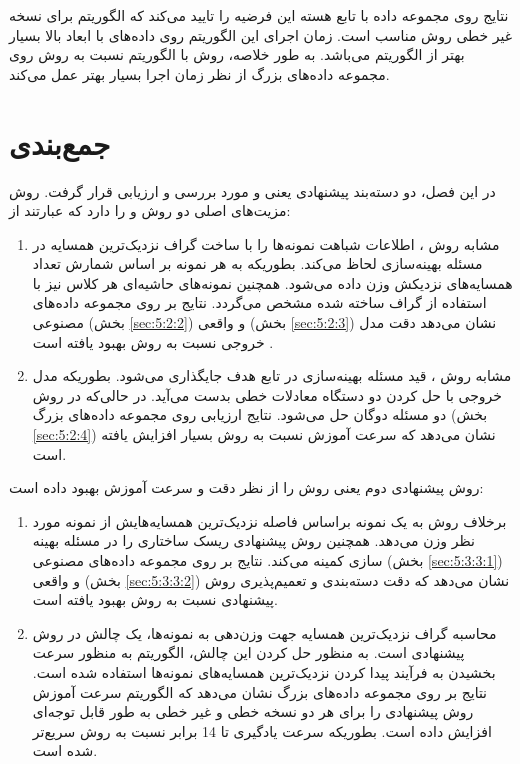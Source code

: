 نتایج روی مجموعه داده  با تابع هسته  این فرضیه را تایید می‌کند که الگوریتم  برای نسخه غیر خطی روش   مناسب است. زمان اجرای این الگوریتم روی داده‌های با ابعاد بالا بسیار بهتر از الگوریتم  می‌باشد. به طور خلاصه، روش  با الگوریتم  نسبت به روش  روی مجموعه داده‌های بزرگ از نظر زمان اجرا بسیار بهتر عمل می‌کند.

\section{جمع‌بندی}\label{sec:5:4}
در این فصل، دو دسته‌بند پیشنهادی یعنی  و  مورد بررسی و ارزیابی قرار گرفت. روش  مزیت‌های اصلی دو روش  و  را دارد که عبارتند از:
\begin{enumerate}
	\item مشابه روش ، اطلاعات شباهت نمونه‌ها را با ساخت گراف نزدیک‌ترین همسایه در مسئله بهینه‌سازی لحاظ می‌کند. بطوریکه به هر نمونه بر اساس شمارش تعداد همسایه‌های نزدیکش وزن داده می‌شود. همچنین نمونه‌های حاشیه‌ای هر کلاس نیز با استفاده از گراف ساخته شده مشخص می‌گردد.  نتایج بر روی مجموعه داده‌های مصنوعی (بخش \ref{sec:5:2:2}) و واقعی (بخش \ref{sec:5:2:3}) نشان می‌دهد دقت مدل خروجی نسبت به روش  بهبود یافته است .
	\item مشابه روش ، قید مسئله بهینه‌سازی در تابع هدف جایگذاری می‌شود. بطوریکه مدل خروجی با حل کردن دو دستگاه معادلات خطی بدست می‌آید. در حالی‌که در روش   دو مسئله دوگان حل می‌شود. نتایج ارزیابی روی مجموعه داده‌های بزرگ  (بخش \ref{sec:5:2:4}) نشان می‌دهد که سرعت آموزش نسبت به روش  بسیار افزایش یافته است.    
\end{enumerate}

روش پیشنهادی دوم یعنی  روش  را از نظر دقت و سرعت آموزش بهبود داده است:
\begin{enumerate}
	\item {} برخلاف روش   به یک نمونه براساس فاصله نزدیک‌ترین همسایه‌هایش از نمونه مورد نظر وزن می‌دهد. همچنین روش پیشنهادی ریسک ساختاری را در مسئله بهینه سازی کمینه می‌کند. نتایج بر روی مجموعه داده‌های مصنوعی  (بخش \ref{sec:5:3:3:1}) و واقعی (بخش  \ref{sec:5:3:3:2}) نشان می‌دهد که دقت دسته‌بندی و تعمیم‌پذیری روش پیشنهادی نسبت به روش  بهبود یافته است.
	\item محاسبه گراف نزدیک‌ترین همسایه جهت وزن‌دهی به نمونه‌ها، یک چالش در روش پیشنهادی است. به منظور حل کردن این چالش، الگوریتم   به منظور سرعت بخشیدن به فرآیند پیدا کردن نزدیک‌ترین همسایه‌های نمونه‌ها استفاده شده است. نتایج بر روی مجموعه داده‌های بزرگ نشان می‌دهد که الگوریتم   سرعت آموزش روش پیشنهادی را برای هر دو نسخه خطی و غیر خطی به طور قابل    توجه‌ای افزایش داده است. بطوریکه سرعت یادگیری تا 14 برابر نسبت به روش  سریع‌تر شده است.
\end{enumerate}

